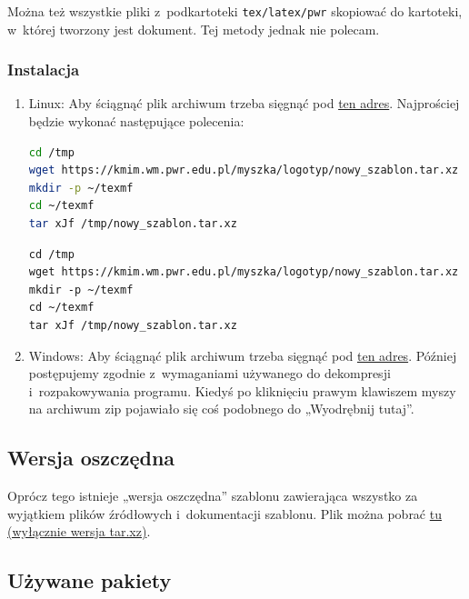 \documentclass[12pt,aspectratio=169,ignorenonframetext]{beamer}
\begin{document}
Można też wszystkie pliki z~podkartoteki \lstinline|tex/latex/pwr| skopiować do kartoteki, w~której tworzony jest dokument. Tej metody jednak nie polecam.

\begin{frame}[fragile]
 \frametitle{Instalacja}
 \begin{enumerate}
  \item Linux: Aby ściągnąć plik archiwum trzeba sięgnąć pod \href{https://kmim.wm.pwr.edu.pl/myszka/logotyp/nowy_szablon.tar.xz}{ten adres}. Najprościej będzie wykonać następujące polecenia:
        \ifpdf
         \begin{lstlisting}[language=bash]
cd /tmp
wget https://kmim.wm.pwr.edu.pl/myszka/logotyp/nowy_szablon.tar.xz
mkdir -p ~/texmf
cd ~/texmf
tar xJf /tmp/nowy_szablon.tar.xz
\end{lstlisting}
        \else
         \begin{verbatim}
cd /tmp
wget https://kmim.wm.pwr.edu.pl/myszka/logotyp/nowy_szablon.tar.xz
mkdir -p ~/texmf
cd ~/texmf
tar xJf /tmp/nowy_szablon.tar.xz
\end{verbatim}
        \fi
  \item Windows: Aby ściągnąć plik archiwum trzeba sięgnąć pod \href{https://kmim.wm.pwr.edu.pl/myszka/logotyp/nowy_szablon.zip}{ten adres}. Później postępujemy zgodnie z~wymaganiami używanego do dekompresji i~rozpakowywania programu. Kiedyś po kliknięciu prawym klawiszem myszy na archiwum zip pojawiało się coś podobnego do „Wyodrębnij tutaj”.
 \end{enumerate}
\end{frame}

\subsection{Wersja oszczędna}

Oprócz tego istnieje „wersja oszczędna” szablonu zawierająca wszystko za wyjątkiem plików źródłowych i~dokumentacji szablonu. Plik można pobrać \href{https://kmim.wm.pwr.edu.pl/myszka/logotyp/nowy_szablon_maly.tar.xz}{tu (wyłącznie wersja tar.xz)}.

\subsection{Używane pakiety}
\end{document}
